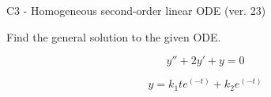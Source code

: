 \begin{exercise}
  \begin{exerciseTitle}C3 - Homogeneous second-order linear ODE (ver. 23)\end{exerciseTitle}
  \begin{exerciseStatement}
    
Find the general solution to the given ODE.

    
\[y''+2y'+y = 0\]

  \end{exerciseStatement}
  \begin{exerciseAnswer}
    
\[y= k_{1} t e^{\left(-t\right)} + k_{2} e^{\left(-t\right)}\]

  \end{exerciseAnswer}
\end{exercise}